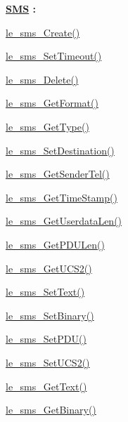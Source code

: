 {\bfseries \hyperlink{c_sms}{S\+MS} \+:}
\begin{DoxyItemize}
\item \hyperlink{le__sms__interface_8h_a668abcbcff2f1f3c5cdf799315a81058}{le\+\_\+sms\+\_\+\+Create()}
\item \hyperlink{le__sms__interface_8h_a2b14febf0e2285b0b3c2dbcd1c2bb7b0}{le\+\_\+sms\+\_\+\+Set\+Timeout()}
\item \hyperlink{le__sms__interface_8h_aca1691010c88995cb47225f2889910fa}{le\+\_\+sms\+\_\+\+Delete()}
\item \hyperlink{le__sms__interface_8h_a5c2b8ce7043b4732c7b0ede7c5d7118c}{le\+\_\+sms\+\_\+\+Get\+Format()}
\item \hyperlink{le__sms__interface_8h_a2a63c6b5179025a80fb86c7f188e1eb7}{le\+\_\+sms\+\_\+\+Get\+Type()}
\item \hyperlink{le__sms__interface_8h_a6fda3e193c9662c394412816ae508c23}{le\+\_\+sms\+\_\+\+Set\+Destination()}
\item \hyperlink{le__sms__interface_8h_aa4651e8dc97aa01df80ed6d9a7a486c6}{le\+\_\+sms\+\_\+\+Get\+Sender\+Tel()}
\item \hyperlink{le__sms__interface_8h_af018ca1bc2085a48e4b6d4691bef3cc7}{le\+\_\+sms\+\_\+\+Get\+Time\+Stamp()}
\item \hyperlink{le__sms__interface_8h_a6165464dd3502b3c76b79b32206ba10f}{le\+\_\+sms\+\_\+\+Get\+Userdata\+Len()}
\item \hyperlink{le__sms__interface_8h_abb89b302e564f3d55d604bb0c0dda022}{le\+\_\+sms\+\_\+\+Get\+P\+D\+U\+Len()}
\item \hyperlink{le__sms__interface_8h_adafdc63a36a6a50c8e942bf69958789f}{le\+\_\+sms\+\_\+\+Get\+U\+C\+S2()}
\item \hyperlink{le__sms__interface_8h_aa5468a01069d8c8d03e5204453560d9a}{le\+\_\+sms\+\_\+\+Set\+Text()}
\item \hyperlink{le__sms__interface_8h_ad135130755ab2979a265f65178a3ae0d}{le\+\_\+sms\+\_\+\+Set\+Binary()}
\item \hyperlink{le__sms__interface_8h_a0fc5c9da622cc48ef5f9d908dbcbbf92}{le\+\_\+sms\+\_\+\+Set\+P\+D\+U()}
\item \hyperlink{le__sms__interface_8h_ac351541bd51f008551a55ea645e31599}{le\+\_\+sms\+\_\+\+Set\+U\+C\+S2()}
\item \hyperlink{le__sms__interface_8h_aebf0c28efce6ec0b9616ffa8ecb80782}{le\+\_\+sms\+\_\+\+Get\+Text()}
\item \hyperlink{le__sms__interface_8h_af652a15437db583f333257ff5cef808d}{le\+\_\+sms\+\_\+\+Get\+Binary()}

\end{DoxyItemize}
